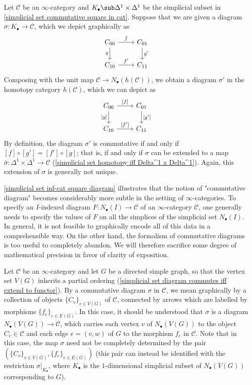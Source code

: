 \begin{example}
Let $\mathcal{C}$ be an $\infty$-category and $K_\bullet\sub\Delta^1\times\Delta^1$ be the simplicial subset in \cref{simplicial set commutative square in cat}. Suppose that we are given a diagram $\sigma:K_\bullet\to\mathcal{C}$, which we depict graphically as
\[\begin{tikzcd}
C_{00}\ar[r,"f"]\ar[d,swap,"g"]&C_{01}\ar[d,"g'"]\\
C_{10}\ar[r,"f'"]&C_{11}
\end{tikzcd}\]
Composing with the unit map $\mathcal{C}\to N_\bullet(h(\mathcal{C}))$, we obtain a diagram $\sigma'$ in the homotopy category $h(\mathcal{C})$, which we can depict as
\[\begin{tikzcd}
C_{00}\ar[r,"{[f]}"]\ar[d,swap,"{[g]}"]&C_{01}\ar[d,"{[g']}"]\\
C_{10}\ar[r,"{[f']}"]&C_{11}
\end{tikzcd}\]
By definition, the diagram $\sigma'$ is commutative if and only if $[f]\circ[g']=[f']\circ[g]$; that is, if and only if $\sigma$ can be extended to a map $\bar{\sigma}:\Delta^1\times\Delta^1\to\mathcal{C}$ (\cref{simplicial set homotopy iff Delta^1 x Delta^1}). Again, this extension of $\sigma$ is generally not unique.
\end{example}
\cref{simplicial set inf-cat square diagram} illustrates that the notion of "commutative diagram" becomes considerably more subtle in the setting of $\infty$-categories. To specify an $I$-indexed diagram $F:N_\bullet(I)\to\mathcal{C}$ of an $\infty$-category $\mathcal{C}$, one generally needs to specify the values of $F$ on all the simplices of the simplicial set $N_\bullet(I)$. In general, it is not feasible to graphically encode all of this data in a comprehensible way. On the other hand, the formalism of commutative diagrams is too useful to completely abandon. We will therefore sacrifice some degree of mathematical precision in favor of clarity of exposition.\par
Let $\mathcal{C}$ be an $\infty$-category and let $G$ be a directed simple graph, so that the vertex set $V(G)$ inherits a partial ordering (\cref{simplicial set diagram commutes iff extend to functor}). By a commutative diagram $\sigma$ in $\mathcal{C}$, we mean graphically by a collection of objects $\{C_v\}_{v\in V(G)}$ of $\mathcal{C}$, connected by arrows which are labelled by morphisms $\{f_e\}_{e\in E(G)}$. In this case, it should be understood that $\sigma$ is a diagram $N_\bullet(V(G))\to\mathcal{C}$, which carries each vertex $v$ of $N_\bullet(V(G))$ to the object $C_v\in\mathcal{C}$ and each edge $e=(v,w)$ of $G$ to the morphism $f_e$ in $\mathcal{C}$. Note that in this case, the map $\sigma$ need not be completely determined by the pair $(\{C_v\}_{v\in V(G)},\{f_e\}_{e\in E(G)})$ (this pair can instead be identified with the restriction $\sigma|_{K_\bullet}$, where $K_\bullet$ is the $1$-dimensional simplicial subset of $N_\bullet(V(G))$ corresponding to $G$).
